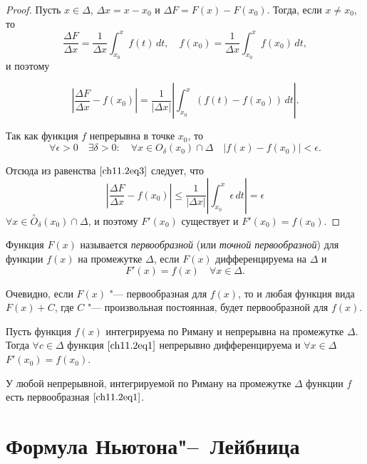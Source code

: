 \begin{proof}
Пусть $x \in \Delta$, $\Delta x = x - x_0$ и $\Delta F = F(x) - F(x_0)$. Тогда, если $x \not= x_0$, то 
$$ 
\frac{\Delta F}{\Delta x} = \frac{1}{\Delta x} \int_{x_0}^{x} f(t) \,dt, \quad f(x_0) = \frac{1}{\Delta x} \int_{x_0}^{x} f(x_0) \,dt,
$$
и поэтому 

\begin{equation} \label{ch11.2eq3}
\left| \frac{\Delta F}{\Delta x} - f(x_0) \right| = \frac{1}{|\Delta x|} \left| \int_{x_0}^{x} \left( f(t) - f(x_0) \right) \,dt \right|.
\end{equation}

Так как функция $f$ непрерывна в точке $x_0$, то
$$
\forall \epsilon > 0 \quad \exists \delta > 0 : \quad \forall x \in O_\delta(x_0) \cap \Delta \quad |f(x) - f(x_0)| < \epsilon.
$$

Отсюда из равенства $\eqref{ch11.2eq3}$ следует, что 
$$
\left| \frac{\Delta F}{\Delta x} - f(x_0) \right| \le \frac{1}{|\Delta x|} \left| \int_{x_0}^{x} \epsilon \,dt\right| = \epsilon
$$
$\forall x \in \overset{\circ}{O}_\delta(x_0) \cap \Delta$, и поэтому $F'(x_0)$  существует и $F'(x_0) = f(x_0).$
\end{proof}

\begin{defn}
Функция $F(x)$ называется \textit{первообразной} (или \textit{точной первообразной}) для функции $f(x)$ на промежутке  $\Delta$, если $F(x)$ дифференцируема на $\Delta$ и
$$
F'(x) = f(x) \quad \forall x \in \Delta.
$$

Очевидно, если $F(x)$ "--- первообразная для $f(x)$, то и любая функция вида $F(x) + C$,  где $C$ "--- произвольная постоянная, будет первообразной для $f(x)$. 
\end{defn}

\begin{cons}
Пусть функция $f(x)$ интегрируема по Риману и непрерывна на промежутке $\Delta$. Тогда $\forall c \in \Delta$ функция $\eqref{ch11.2eq1}$ непрерывно дифференцируема и $\forall x \in \Delta$ $F'(x_0) = f(x_0)$. 
\end{cons}
У  любой непрерывной, интегрируемой по Риману на промежутке $\Delta$ функции $f$ есть первообразная $\eqref{ch11.2eq1}$.

\section[Формула Ньютона"--~Лейбница]{Формула Ньютона"--~Лейбница}

